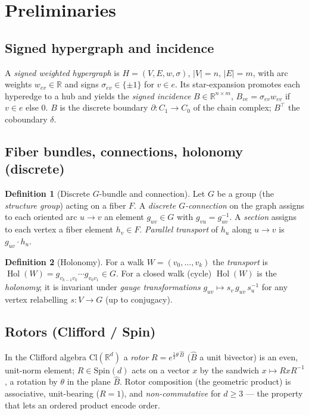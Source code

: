 \documentclass[11pt]{article}
\theoremstyle{definition}
\newtheorem{definition}{Definition}
\theoremstyle{plain}
\theoremstyle{remark}
\newcommand{\Hol}{\operatorname{Hol}}
\newcommand{\Spin}{\mathrm{Spin}}
\newcommand{\R}{\mathbb{R}}
\begin{document}
\section{Preliminaries}
\subsection{Signed hypergraph and incidence}
A \emph{signed weighted hypergraph} is $H=(V,E,w,\sigma)$, $|V|=n$, $|E|=m$, with arc weights $w_{ev}\in\R$ and
signs $\sigma_{ev}\in\{\pm1\}$ for $v\in e$. Its star-expansion promotes each hyperedge to a hub and yields the
\emph{signed incidence} $B\in\R^{n\times m}$, $B_{ve}=\sigma_{ev}w_{ev}$ if $v\in e$ else $0$. $B$ is the discrete
boundary $\partial:C_1\!\to\!C_0$ of the chain complex; $B^{\!\top}$ the coboundary $\delta$.

\subsection{Fiber bundles, connections, holonomy (discrete)}
\begin{definition}[Discrete $G$-bundle and connection]
Let $G$ be a group (the \emph{structure group}) acting on a fiber $F$. A \emph{discrete $G$-connection} on the
graph assigns to each oriented arc $u\!\to\!v$ an element $g_{uv}\in G$ with $g_{vu}=g_{uv}^{-1}$. A
\emph{section} assigns to each vertex a fiber element $h_v\in F$. \emph{Parallel transport} of $h_u$ along
$u\!\to\!v$ is $g_{uv}\!\cdot\!h_u$.
\end{definition}
\begin{definition}[Holonomy]
For a walk $W=(v_0,\dots,v_k)$ the \emph{transport} is $\Hol(W)=g_{v_{k-1}v_k}\cdots g_{v_0v_1}\in G$. For a
closed walk (cycle) $\Hol(W)$ is the \emph{holonomy}; it is invariant under \emph{gauge transformations}
$g_{uv}\mapsto s_v\,g_{uv}\,s_u^{-1}$ for any vertex relabelling $s:V\to G$ (up to conjugacy).
\end{definition}

\subsection{Rotors (Clifford / Spin)}
In the Clifford algebra $\mathrm{Cl}(\R^d)$ a \emph{rotor} $R=e^{\tfrac12\theta\,\hat B}$ ($\hat B$ a unit
bivector) is an even, unit-norm element; $R\in\Spin(d)$ acts on a vector $x$ by the sandwich $x\mapsto R x R^{-1}$,
a rotation by $\theta$ in the plane $\hat B$. Rotor composition (the geometric product) is associative,
unit-bearing ($R=1$), and \emph{non-commutative} for $d\ge 3$ --- the property that lets an ordered product encode
order.
\end{document}
